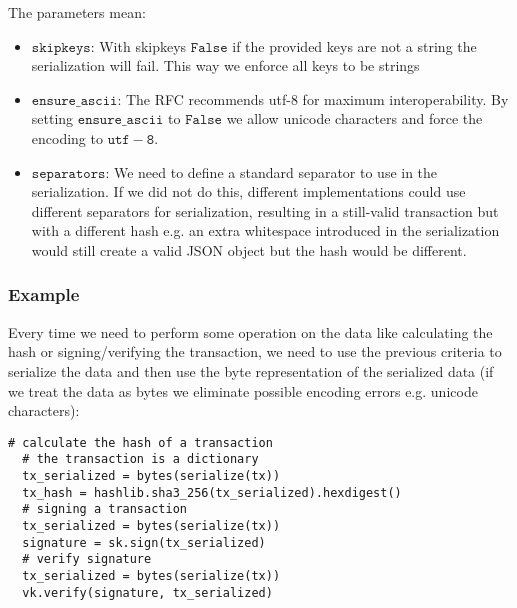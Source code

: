 \noindent The parameters mean: 
\begin{itemize}
 \item $\mathtt{skipkeys}$: With skipkeys $\mathtt{False}$ if the provided keys are not a string the serialization will fail. This way we enforce all keys to be strings
 \item $\mathtt{ensure\_ascii}$: The RFC recommends utf-8 for maximum interoperability. By setting $\mathtt{ensure\_ascii}$ to $\mathtt{False}$ we allow unicode characters and force the encoding to $\mathtt{utf-8}$. 
 \item $\mathtt{separators}$: We need to define a standard separator to use in the serialization. If we did not do this, different implementations could use different separators for serialization, resulting in a still-valid transaction but with a different hash e.g. an extra whitespace introduced in the serialization would still create a valid JSON object but the hash would be different.
\end{itemize}

\subsubsection{Example}
Every time we need to perform some operation on the data like calculating the hash or signing/verifying the transaction, we need to use the previous criteria to serialize the data and then use the byte representation of the serialized data (if we treat the data as bytes we eliminate possible encoding errors e.g. unicode characters):

\begin{minipage}{\linewidth}
  \begin{lstlisting}[style=python]
  # calculate the hash of a transaction 
  # the transaction is a dictionary 
  tx_serialized = bytes(serialize(tx)) 
  tx_hash = hashlib.sha3_256(tx_serialized).hexdigest() 
  # signing a transaction 
  tx_serialized = bytes(serialize(tx)) 
  signature = sk.sign(tx_serialized) 
  # verify signature 
  tx_serialized = bytes(serialize(tx)) 
  vk.verify(signature, tx_serialized)\end{lstlisting}
\end{minipage}

